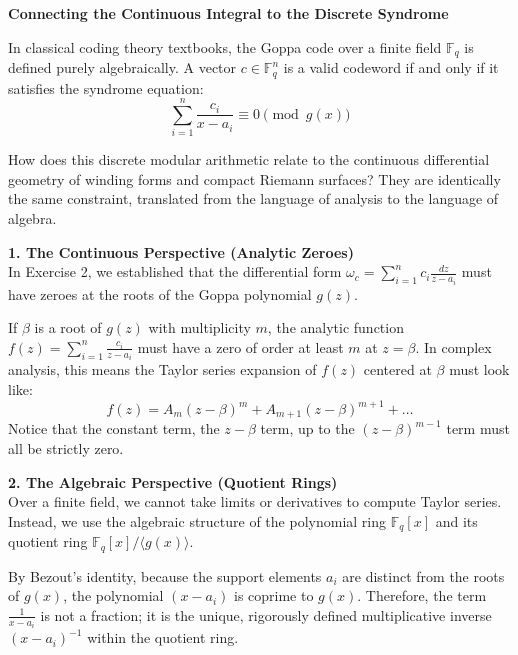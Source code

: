 \documentclass[11pt]{article}
\begin{document}
	\vspace{1cm}
	
	\begin{mdframed}[backgroundcolor=white, linecolor=black, linewidth=1.5pt, roundcorner=5pt, innerleftmargin=15pt, innerrightmargin=15pt, innertopmargin=15pt, innerbottommargin=15pt]
		
		\textbf{Connecting the Continuous Integral to the Discrete Syndrome}
		
		In classical coding theory textbooks, the Goppa code over a finite field $\mathbb{F}_q$ is defined purely algebraically. A vector $c \in \mathbb{F}_q^n$ is a valid codeword if and only if it satisfies the syndrome equation:
		$$ \sum_{i=1}^n \frac{c_i}{x - a_i} \equiv 0 \pmod{g(x)} $$
		
		How does this discrete modular arithmetic relate to the continuous differential geometry of winding forms and compact Riemann surfaces? They are identically the same constraint, translated from the language of analysis to the language of algebra.
		
		\vspace{0.5cm}
		\textbf{1. The Continuous Perspective (Analytic Zeroes)} \\
		In Exercise 2, we established that the differential form $\omega_c = \sum_{i=1}^n c_i \frac{dz}{z - a_i}$ must have zeroes at the roots of the Goppa polynomial $g(z)$. 
		
		If $\beta$ is a root of $g(z)$ with multiplicity $m$, the analytic function $f(z) = \sum_{i=1}^n \frac{c_i}{z - a_i}$ must have a zero of order at least $m$ at $z = \beta$. In complex analysis, this means the Taylor series expansion of $f(z)$ centered at $\beta$ must look like:
		$$ f(z) = A_m (z - \beta)^m + A_{m+1} (z - \beta)^{m+1} + \dots $$
		Notice that the constant term, the $z-\beta$ term, up to the $(z-\beta)^{m-1}$ term must all be strictly zero.
		
		\vspace{0.5cm}
		\textbf{2. The Algebraic Perspective (Quotient Rings)} \\
		Over a finite field, we cannot take limits or derivatives to compute Taylor series. Instead, we use the algebraic structure of the polynomial ring $\mathbb{F}_q[x]$ and its quotient ring $\mathbb{F}_q[x]/\langle g(x) \rangle$.
		
		By Bezout's identity, because the support elements $a_i$ are distinct from the roots of $g(x)$, the polynomial $(x - a_i)$ is coprime to $g(x)$. Therefore, the term $\frac{1}{x - a_i}$ is not a fraction; it is the unique, rigorously defined multiplicative inverse $(x - a_i)^{-1}$ within the quotient ring.
		

\end{mdframed}
\end{document}
